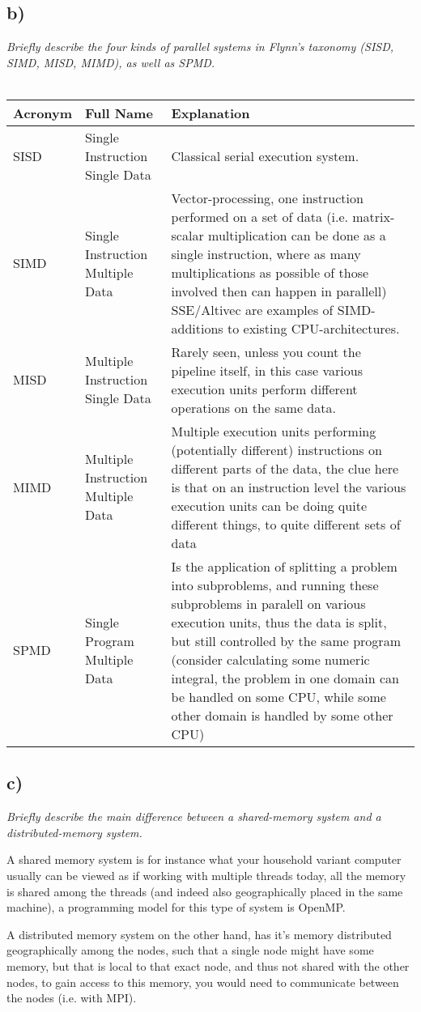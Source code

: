 \documentclass[a4paper]{article}
\begin{document}
\subsection*{b)} \textit{Briefly describe the four kinds of parallel systems in Flynn’s taxonomy (SISD, SIMD, MISD, MIMD),
as well as SPMD.}\\ \\
\begin{tabular}{ | l | l | p{8.4cm} | } \hline
\textbf{Acronym} & \textbf{Full Name} & \textbf{Explanation} \\ \hline
SISD & Single Instruction Single Data & Classical serial execution system. \\ \hline
SIMD & Single Instruction Multiple Data & Vector-processing, one instruction performed on a set of data (i.e. matrix-scalar multiplication can be done as a single instruction, where as many multiplications as possible of those involved then can happen in parallell) SSE/Altivec are examples of SIMD-additions to existing CPU-architectures. \\\hline
MISD & Multiple Instruction Single Data &  Rarely seen, unless you count the pipeline itself, in this case various execution units perform different operations on the same data.\\\hline
MIMD & Multiple Instruction Multiple Data & Multiple execution units performing (potentially different) instructions on different parts of the data, the clue here is that on an instruction level the various execution units can be doing quite different things, to quite different sets of data\\\hline
SPMD & Single Program Multiple Data & Is the application of splitting a problem into subproblems, and running these subproblems in paralell on various execution units, thus the data is split, but still controlled by the same program (consider calculating some numeric integral, the problem in one domain can be handled on some CPU, while some other domain is handled by some other CPU)\\ \hline
\end{tabular} 

\subsection*{c)} \textit{Briefly describe the main difference between a shared-memory system and a distributed-memory
system.}

A shared memory system is for instance what your household variant computer usually can be viewed as if working with multiple threads today, all the memory is shared among the threads (and indeed also geographically placed in the same machine), a programming model for this type of system is OpenMP.

A distributed memory system on the other hand, has it's memory distributed geographically among the nodes, such that a single node might have some memory, but that is local to that exact node, and thus not shared with the other nodes, to gain access to this memory, you would need to communicate between the nodes (i.e. with MPI).
\end{document}
